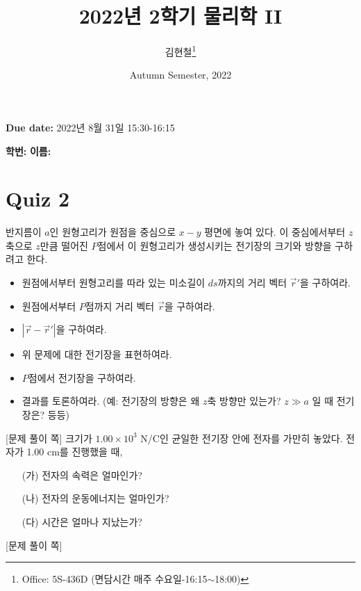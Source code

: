 \documentclass[tightenlines,floatfix,nofootinbib,superscriptaddress,fleqn]{revtex4}
\begin{document}
\title{\Large 2022년 2학기 물리학 II}
\author{김현철\footnote{Office: 5S-436D (면담시간 매주
    수요일-16:15$\sim$18:00)}} 
\date{Autumn Semester, 2022}

\maketitle

{\color{red} {\bf Due date:} 2022년 8월 31일  15:30-16:15 }
\vspace{1.cm}


{\bf 학번:} \hspace{4cm}
{\bf 이름:} 

\section*{\large Quiz 2}
반지름이 $a$인 원형고리가 원점을 중심으로 $x-y$ 평면에 놓여 있다.  
이 중심에서부터 $z$축으로 $z$만큼 떨어진 $P$점에서 이 원형고리가
생성시키는 전기장의 크기와 방향을 구하려고 한다.
\begin{itemize}
\item 원점에서부터 원형고리를 따라 있는 미소길이 $ds$까지의 거리 벡터
  $\vec{r}'$을 구하여라. 
\item 원점에서부터 $P$점까지 거리 벡터 $\vec{r}$을 구하여라.
\item $|\vec{r}-\vec{r}'|$을 구하여라. 

\item 위 문제에 대한 전기장을 표현하여라.
\item $P$점에서 전기장을 구하여라. 
\item 결과를 토론하여라. (예: 전기장의 방향은 왜 $z$축 방향만 있는가?
  $z\gg a$ 일 때 전기장은? 등등)  
\end{itemize}

\newpage
{\color{gray} [문제 풀이 쪽]}
\newpage
{}크기가 $1.00\times 10^3$ N/C인 균일한
전기장 안에 전자를 가만히 놓았다. 전자가 1.00 cm를 진행했을 때,
\begin{itemize}
\item[(가)] 전자의 속력은 얼마인가? 
\item[(나)] 전자의 운동에너지는 얼마인가? 
\item[(다)] 시간은 얼마나 지났는가? 
\end{itemize}
\newpage
{\color{gray} [문제 풀이 쪽]}
\newpage
\end{document}
